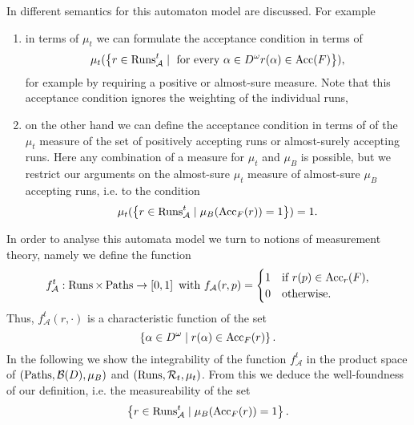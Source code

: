 In \cite{RandAutoInfTrees} different semantics for this automaton model are
discussed. For example
\begin{enumerate}
  \item in terms of $\mu_{t}$ we can formulate the acceptance condition in 
    terms of
    \begin{equation*}
      \mu_{t}(
        \left\{
          r\in\operatorname{Runs}_{\mathcal{A}}^{t}\mid
            \text{ for every }\alpha\in D^{\omega}r(\alpha)\in\operatorname{Acc}(F)
        \right\}
      ),
    \end{equation*}
    for example by requiring a positive or almost-sure measure. Note that this
    acceptance condition ignores the weighting of the individual runs,
  \item on the other hand we can define the acceptance condition in terms of
    of the $\mu_{t}$ measure of the set of positively accepting runs or 
    almost-surely accepting runs. Here any combination of a measure for 
    $\mu_{t}$ and $\mu_{B}$ is possible, but we restrict our arguments on the 
    almost-sure $\mu_{t}$ measure of almost-sure $\mu_{B}$ accepting runs, i.e.
    to the condition
    \begin{equation*}
      \mu_{t}(
        \left\{
          r\in\operatorname{Runs}_{\mathcal{A}}^{t}\mid
            \mu_{B}(\operatorname{Acc}_{F}(r)) = 1
        \right\}
      ) = 1.
    \end{equation*}
\end{enumerate}
In order to analyse this automata model we turn to notions of measurement 
theory, namely we define the function
\begin{equation*}
  f_{\mathcal{A}}^{t}:\operatorname{Runs}\times\operatorname{Paths}\rightarrow\left[0,1\right]
  \text{ with }
  f_{\mathcal{A}}(r, p) = \begin{cases}
    1&\text{if }r(p)\in\operatorname{Acc}_{r}(F),\\
    0&\text{otherwise.}
  \end{cases}
\end{equation*}
Thus, $f_{\mathcal{A}}^{t}(r,\cdot)$ is a characteristic function of the set
\begin{equation*}
  \left\{\alpha\in D^{\omega}\mid r(\alpha)\in\operatorname{Acc}_{F}(r)\right\}.
\end{equation*}
In the following we show the integrability of the function 
$f_{\mathcal{A}}^{t}$ in the product space of 
$\left(\operatorname{Paths}, \mathcal{B}(D), \mu_{B}\right)$ and 
$\left(\operatorname{Runs}, \mathcal{R}_{t}, \mu_{t}\right)$. From this we deduce the 
well-foundness of our definition, i.e. the measureability of the set
\begin{equation*}
  \left\{
    r\in\operatorname{Runs}_{\mathcal{A}}^{t}\mid
      \mu_{B}(\operatorname{Acc}_{F}(r)) = 1
  \right\}.
\end{equation*}
